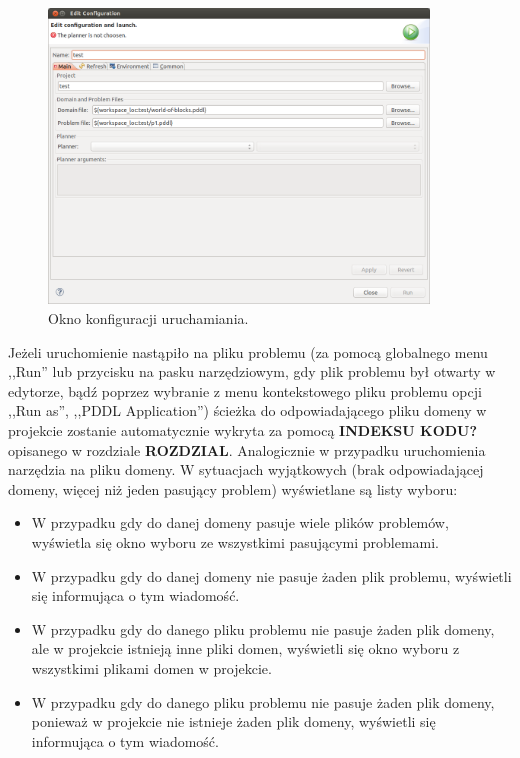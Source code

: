 \begin{figure}[h!]
    \centering
    \includegraphics[width=0.9\textwidth]{img/run_configuration_window}
    \caption{Okno konfiguracji uruchamiania.}
    \label{fig:run_configuration_window}
\end{figure}

Jeżeli uruchomienie nastąpiło na pliku problemu (za pomocą globalnego menu ,,Run'' lub przycisku na pasku narzędziowym, gdy plik problemu był otwarty w edytorze, bądź poprzez wybranie z menu kontekstowego pliku problemu opcji ,,Run as'', ,,PDDL Application'') ścieżka do odpowiadającego pliku domeny w projekcie zostanie automatycznie wykryta za pomocą \textbf{INDEKSU KODU?} opisanego w rozdziale \textbf{ROZDZIAL}. Analogicznie w przypadku uruchomienia narzędzia na pliku domeny. W sytuacjach wyjątkowych (brak odpowiadającej domeny, więcej niż jeden pasujący problem) wyświetlane są listy wyboru:
\begin{itemize}
\item W przypadku gdy do danej domeny pasuje wiele plików problemów, wyświetla się okno wyboru ze wszystkimi pasującymi problemami.
\item W przypadku gdy do danej domeny nie pasuje żaden plik problemu, wyświetli się informująca o tym wiadomość.
\item W przypadku gdy do danego pliku problemu nie pasuje żaden plik domeny, ale w projekcie istnieją inne pliki domen, wyświetli się okno wyboru z wszystkimi plikami domen w projekcie.
\item W przypadku gdy do danego pliku problemu nie pasuje żaden plik domeny, ponieważ w projekcie nie istnieje żaden plik domeny, wyświetli się informująca o tym wiadomość.
\end{itemize}

